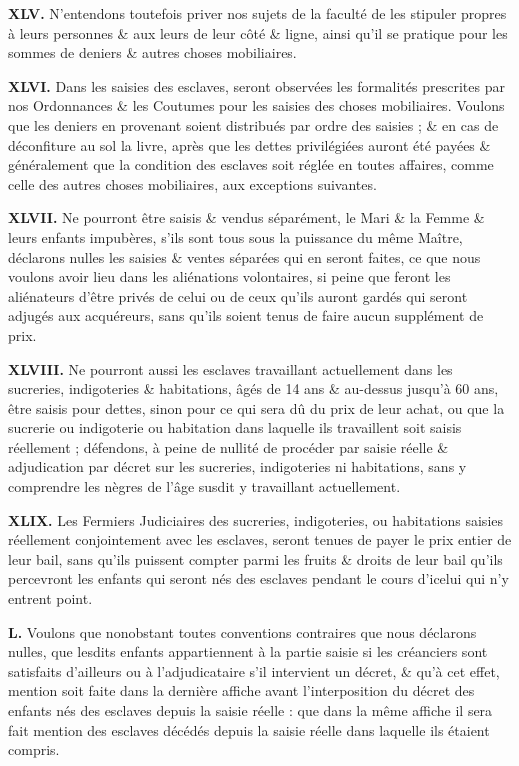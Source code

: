 \documentclass[french,twoside]{book} %
\newcommand{\labelchar}[1]{{\color{rubric}\bf #1}}
\begin{document}
\labelchar{XLV.} N’entendons toutefois priver nos sujets de la faculté de les stipuler propres à leurs personnes \& aux leurs de leur côté \& ligne, ainsi qu’il se pratique pour les sommes de deniers \& autres choses mobiliaires.\par
\labelchar{XLVI.} Dans les saisies des esclaves, seront observées les formalités prescrites par nos Ordonnances \& les Coutumes pour les saisies des choses mobiliaires. Voulons que les deniers en provenant soient distribués par ordre des saisies ; \& en cas de déconfiture au sol la livre, après que les dettes privilégiées auront été payées \& généralement que la condition des esclaves soit réglée en toutes affaires, comme celle des autres choses mobiliaires, aux exceptions suivantes.\par
\labelchar{XLVII.} Ne pourront être saisis \& vendus séparément, le Mari \& la Femme \& leurs enfants impubères, s’ils sont tous sous la puissance du même Maître, déclarons nulles les saisies \& ventes séparées qui en seront faites, ce que nous voulons avoir lieu dans les aliénations volontaires, si peine que feront les aliénateurs d’être privés de celui ou de ceux qu’ils auront gardés qui seront adjugés aux acquéreurs, sans qu’ils soient tenus de faire aucun supplément de prix.\par
\labelchar{XLVIII.} Ne pourront aussi les esclaves travaillant actuellement dans les sucreries, indigoteries \& habitations, âgés de 14 ans \& au-dessus jusqu’à 60 ans, être saisis pour dettes, sinon pour ce qui sera dû du prix de leur achat, ou que la sucrerie ou indigoterie ou habitation dans laquelle ils travaillent soit saisis réellement ; défendons, à peine de nullité de procéder par saisie réelle \& adjudication par décret sur les sucreries, indigoteries ni habitations, sans y comprendre les nègres de l’âge susdit y travaillant actuellement.\par
\labelchar{XLIX.} Les Fermiers Judiciaires des sucreries, indigoteries, ou habitations saisies réellement conjointement avec les esclaves, seront tenues de payer le prix entier de leur bail, sans qu’ils puissent compter parmi les fruits \& droits de leur bail qu’ils percevront les enfants qui seront nés des esclaves pendant le cours d’icelui qui n’y entrent point.\par
\labelchar{L.} Voulons que nonobstant toutes conventions contraires que nous déclarons nulles, que lesdits enfants appartiennent à la partie saisie si les créanciers sont satisfaits d’ailleurs ou à l’adjudicataire s’il intervient un décret, \& qu’à cet effet, mention soit faite dans la dernière affiche avant l’interposition du décret des enfants nés des esclaves depuis la saisie réelle : que dans la même affiche il sera fait mention des esclaves décédés depuis la saisie réelle dans laquelle ils étaient compris.\par
\end{document}
